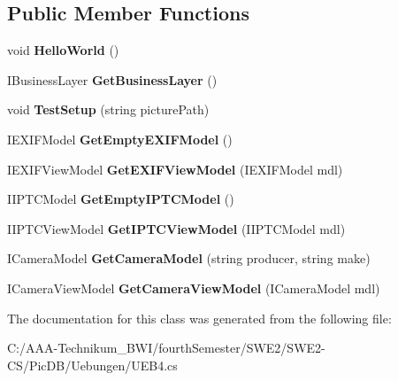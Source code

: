 \subsection*{Public Member Functions}
\begin{DoxyCompactItemize}
\item 
\mbox{\label{class_pic_d_b_1_1_uebungen_1_1_u_e_b4_ad29c2052f9868e0efa2a46eb2262c263}} 
void {\bfseries Hello\+World} ()
\item 
\mbox{\label{class_pic_d_b_1_1_uebungen_1_1_u_e_b4_a7db95feb7619301f3676d332c22c60ad}} 
I\+Business\+Layer {\bfseries Get\+Business\+Layer} ()
\item 
\mbox{\label{class_pic_d_b_1_1_uebungen_1_1_u_e_b4_a6239e081d10a7eed0d8b3fad2e4c6cf0}} 
void {\bfseries Test\+Setup} (string picture\+Path)
\item 
\mbox{\label{class_pic_d_b_1_1_uebungen_1_1_u_e_b4_a8d981c2669dd8577ea9cca3db39e068c}} 
I\+E\+X\+I\+F\+Model {\bfseries Get\+Empty\+E\+X\+I\+F\+Model} ()
\item 
\mbox{\label{class_pic_d_b_1_1_uebungen_1_1_u_e_b4_acc3ee1311b77c288175f92df8441a049}} 
I\+E\+X\+I\+F\+View\+Model {\bfseries Get\+E\+X\+I\+F\+View\+Model} (I\+E\+X\+I\+F\+Model mdl)
\item 
\mbox{\label{class_pic_d_b_1_1_uebungen_1_1_u_e_b4_acfcb409ba2b05ce29b7b5f12f46f4d25}} 
I\+I\+P\+T\+C\+Model {\bfseries Get\+Empty\+I\+P\+T\+C\+Model} ()
\item 
\mbox{\label{class_pic_d_b_1_1_uebungen_1_1_u_e_b4_ab0f953f218f04ae38ae91b80979195c2}} 
I\+I\+P\+T\+C\+View\+Model {\bfseries Get\+I\+P\+T\+C\+View\+Model} (I\+I\+P\+T\+C\+Model mdl)
\item 
\mbox{\label{class_pic_d_b_1_1_uebungen_1_1_u_e_b4_af54d77388a52be066cd48cf8a103c123}} 
I\+Camera\+Model {\bfseries Get\+Camera\+Model} (string producer, string make)
\item 
\mbox{\label{class_pic_d_b_1_1_uebungen_1_1_u_e_b4_a379d20a0974b89b6a1da44dec6b15a57}} 
I\+Camera\+View\+Model {\bfseries Get\+Camera\+View\+Model} (I\+Camera\+Model mdl)
\end{DoxyCompactItemize}


The documentation for this class was generated from the following file\+:\begin{DoxyCompactItemize}
\item 
C\+:/\+A\+A\+A-\/\+Technikum\+\_\+\+B\+W\+I/fourth\+Semester/\+S\+W\+E2/\+S\+W\+E2-\/\+C\+S/\+Pic\+D\+B/\+Uebungen/U\+E\+B4.\+cs\end{DoxyCompactItemize}
